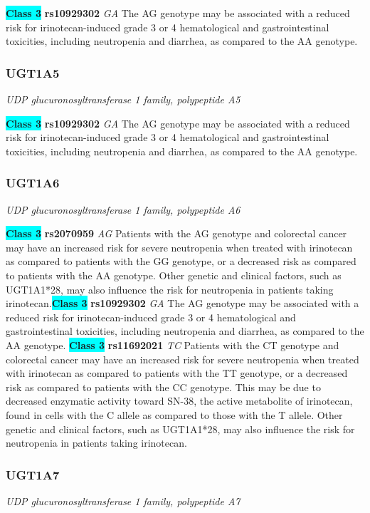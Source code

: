 \documentclass{report}
\begin{document}
\textbf{\colorbox{cyan} {Class 3}} \textbf{ rs10929302 } \textit{ GA }
The AG genotype may be associated with a reduced risk for irinotecan-induced grade 3 or 4 hematological and gastrointestinal toxicities, including neutropenia and diarrhea, as compared to the AA genotype. \newline\subsubsection{ UGT1A5 }
\textit{ UDP glucuronosyltransferase 1 family, polypeptide A5 }

\textbf{\colorbox{cyan} {Class 3}} \textbf{ rs10929302 } \textit{ GA }
The AG genotype may be associated with a reduced risk for irinotecan-induced grade 3 or 4 hematological and gastrointestinal toxicities, including neutropenia and diarrhea, as compared to the AA genotype. \newline\subsubsection{ UGT1A6 }
\textit{ UDP glucuronosyltransferase 1 family, polypeptide A6 }

\textbf{\colorbox{cyan} {Class 3}} \textbf{ rs2070959 } \textit{ AG }
Patients with the AG genotype and colorectal cancer may have an increased risk for severe neutropenia when treated with irinotecan as compared to patients with the GG genotype, or a decreased risk as compared to patients with the AA genotype. Other genetic and clinical factors, such as UGT1A1*28, may also influence the risk for neutropenia in patients taking irinotecan.\newline\textbf{\colorbox{cyan} {Class 3}} \textbf{ rs10929302 } \textit{ GA }
The AG genotype may be associated with a reduced risk for irinotecan-induced grade 3 or 4 hematological and gastrointestinal toxicities, including neutropenia and diarrhea, as compared to the AA genotype. \newline\textbf{\colorbox{cyan} {Class 3}} \textbf{ rs11692021 } \textit{ TC }
Patients with the CT genotype and colorectal cancer may have an increased risk for severe neutropenia when treated with irinotecan as compared to patients with the TT genotype, or a decreased risk as compared to patients with the CC genotype. This may be due to decreased enzymatic activity toward SN-38, the active metabolite of irinotecan, found in cells with the C allele as compared to those with the T allele. Other genetic and clinical factors, such as UGT1A1*28, may also influence the risk for neutropenia in patients taking irinotecan.\newline\subsubsection{ UGT1A7 }
\textit{ UDP glucuronosyltransferase 1 family, polypeptide A7 }
\end{document}
